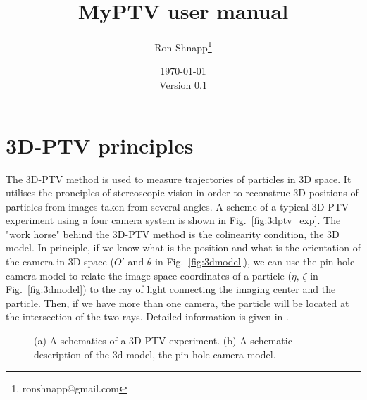 \documentclass[10pt,a4paper]{article}
\title{MyPTV user manual}
\author{Ron Shnapp\footnote{ronshnapp@gmail.com}}
\date{\today\\[.3cm] Version 0.1}
\begin{document}
	
\maketitle

\tableofcontents
\newpage








\section{3D-PTV principles}


The 3D-PTV method is used to measure trajectories of particles in 3D space. It utilises the pronciples of stereoscopic vision in order to reconstruc 3D positions of particles from images taken from several angles. A scheme of a typical 3D-PTV experiment using a four camera system is shown in Fig.~\ref{fig:3dptv_exp}. The "work horse" behind the 3D-PTV method is the colinearity condition, the 3D model. In principle, if we know what is the position and what is the orientation of the camera in 3D space ($O'$ and $\theta$ in Fig.~\ref{fig:3dmodel}), we can use the pin-hole camera model to relate the image space coordinates of a particle ($\eta,\, \zeta$ in Fig.~\ref{fig:3dmodel}) to the ray of light connecting the imaging center and the particle. Then, if we have more than one camera, the particle will be located at the intersection of the two rays. Detailed information is given in \cite{Virant1997, Mass1993}.  


\begin{figure}[h!]
	\centering
	\hfill
	\caption{(a) A schematics of a 3D-PTV experiment. (b) A schematic description of the 3d model, the pin-hole camera model.}
\end{figure}
\end{document}
